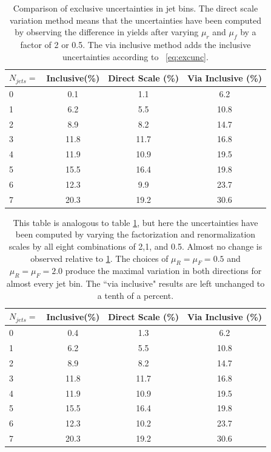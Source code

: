 \documentclass[oneside, letterpaper, oldfontcommands]{memoir}
\begin{document}
\begin{table}[hbtp]
 \centering  
 \caption{Comparison of exclusive uncertainties in jet bins. The direct scale variation method means that the uncertainties have been computed by observing the difference in yields after varying $\mu_{r}$ and $\mu_{f}$ by a factor of 2 or 0.5. The via inclusive method adds the inclusive uncertainties according to ~\ref{eq:excunc}.}
  \label{tab:JetUncTable}
  
      \begin{tabular}{l|c|c|c} \hline
    $N_{jets} =$       &Inclusive(\%)   &  Direct Scale (\%)    & Via Inclusive (\%) \\ \hline
    0                  & 0.1   & 1.1  & 6.2 \\
    1                  & 6.2   & 5.5  & 10.8\\
    2                  & 8.9   & 8.2  & 14.7\\
    3                  & 11.8  & 11.7 & 16.8\\
    4                  & 11.9  & 10.9 & 19.5\\
    5                  & 15.5  & 16.4 & 19.8\\
    6                  & 12.3  & 9.9  & 23.7\\
    7                  & 20.3  & 19.2 & 30.6\\
  \hline
  \end{tabular}
  \end{table}
  
   \begin{table}[hbtp]
 \centering  
 \caption{This table is analogous to table \ref{tab:JetUncTable}, but here the uncertainties have been computed by varying the factorization and renormalization scales by all eight combinations of 2,1, and 0.5. Almost no change is observed relative to \ref{tab:JetUncTable}. The choices of $\mu_{R} = \mu_{F} = 0.5$ and $\mu_{R} = \mu_{F} = 2.0$ produce the maximal variation in both directions for almost every jet bin. The ``via inclusive" results are left unchanged to a tenth of a percent.}
  \label{tab:JetUncTableDoubleHalf}
  \begin{tabular}{l|c|c|c} \hline
    $N_{jets} =$       &Inclusive(\%)   &  Direct Scale (\%)    & Via Inclusive (\%) \\ \hline
    0                  & 0.4   & 1.3  & 6.2 \\
    1                  & 6.2   & 5.5  & 10.8\\
    2                  & 8.9   & 8.2  & 14.7\\
    3                  & 11.8  & 11.7 & 16.8\\
    4                  & 11.9  & 10.9 & 19.5\\
    5                  & 15.5  & 16.4 & 19.8\\
    6                  & 12.3  & 10.2  & 23.7\\
    7                  & 20.3  & 19.2 & 30.6\\
  \hline
  \end{tabular}
  

\end{table}
\end{document}
